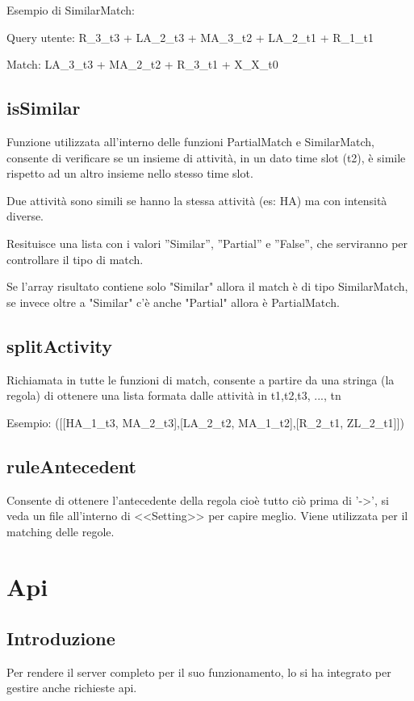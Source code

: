 \documentclass[a4paper]{article}
\begin{document}
Esempio di SimilarMatch: 

Query utente: R\_3\_t3 + LA\_2\_t3 + MA\_3\_t2 + LA\_2\_t1 + R\_1\_t1

Match: LA\_3\_t3 + MA\_2\_t2 + R\_3\_t1 + X\_X\_t0


\subsection{isSimilar}
Funzione utilizzata all'interno delle funzioni PartialMatch e SimilarMatch, consente di verificare se un insieme di attività, in un dato time slot (t2), è simile rispetto ad un altro insieme nello stesso time slot.

Due attività sono simili se hanno la stessa attività (es: HA) ma con intensità diverse.

Resituisce una lista con i valori ''Similar'', ''Partial'' e ''False'', che serviranno per controllare il tipo di match.

Se l'array risultato contiene solo "Similar" allora il match è di tipo SimilarMatch, se invece oltre a "Similar" c'è anche "Partial" allora è PartialMatch.

\subsection{splitActivity}
Richiamata in tutte le funzioni di match, consente a partire da una stringa (la regola) di ottenere una lista formata dalle attività in t1,t2,t3, ..., tn 

Esempio: ([[HA\_1\_t3, MA\_2\_t3],[LA\_2\_t2, MA\_1\_t2],[R\_2\_t1, ZL\_2\_t1]])

\subsection{ruleAntecedent}
Consente di ottenere l'antecedente della regola cioè tutto ciò prima di '->', si veda un file all'interno di <<Setting>> per capire meglio.
Viene utilizzata per il matching delle regole.


\section{Api}
\subsection{Introduzione}
Per rendere il server completo per il suo funzionamento, lo si ha integrato per gestire anche richieste api.
\end{document}
